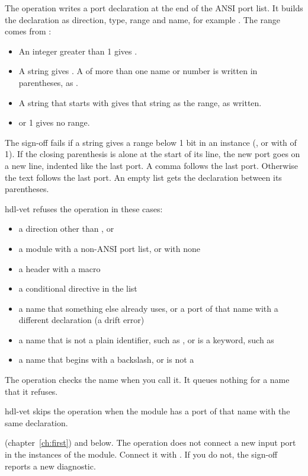 \begin{entry}{}
\item[Writes] The operation writes a port declaration at the end of the ANSI port list.
  It builds the declaration as direction, type, range and name, for example
  . The range comes from :
  \begin{itemize}
  \item An integer greater than 1 gives \code{[N-1:0]}.
  \item A string  gives \code{[W-1:0]}. A  of more than one name or number
    is written in parentheses, as \code{[(N >> 1)-1:0]}.
  \item A string that starts with \code{[} gives that string as the range, as written.
  \item {} or 1 gives no range.
  \end{itemize}
  The sign-off fails if a string  gives a range below 1 bit in an instance
  (, or  with  of 1).
  If the closing parenthesis is alone at the start of its line, the new port
  goes on a new line, indented like the last port. A comma follows the last
  port. Otherwise the text  follows the last port. An empty
  list gets the declaration between its parentheses.
\item[Refused] hdl-vet refuses the operation in these cases:
  \begin{itemize}
  \item a direction other than ,  or 
  \item a module with a non-ANSI port list, or with none
  \item a header with a macro
  \item a conditional directive in the list
  \item a name that something else already uses, or a port of that name with a different
    declaration (a drift error)
  \item a name that is not a plain identifier, such as , or is a keyword,
    such as 
  \item a name that begins with a backslash, or is not a 
  \end{itemize}
  The operation checks the name when you call it. It queues nothing for a name that it
  refuses.
\item[Again] hdl-vet skips the operation when the module has a port of that name with the
  same declaration.
\item[Example]  (chapter~\ref{ch:first}) and  below.
  The operation does not connect a new input port in the instances of the module.
  Connect it with . If you do not, the sign-off reports a new
  diagnostic.
\end{entry}

